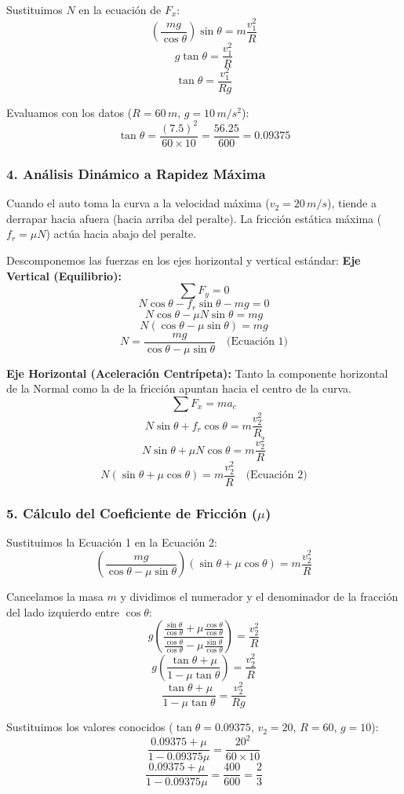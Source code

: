 \documentclass[12pt, a4paper]{article}
\begin{document}
Sustituimos $N$ en la ecuación de $F_x$:
$$ \left( \frac{mg}{\cos\theta} \right) \sin\theta = m \frac{v_1^2}{R} $$
$$ g \tan\theta = \frac{v_1^2}{R} $$
$$ \tan\theta = \frac{v_1^2}{Rg} $$

Evaluamos con los datos ($R = 60 \, \si{m}$, $g = 10 \, \si{m/s^2}$):
$$ \tan\theta = \frac{(7.5)^2}{60 \times 10} = \frac{56.25}{600} = 0.09375 $$

\subsubsection*{4. Análisis Dinámico a Rapidez Máxima}
Cuando el auto toma la curva a la velocidad máxima ($v_2 = 20 \, \si{m/s}$), tiende a derrapar hacia afuera (hacia arriba del peralte). La fricción estática máxima ($f_r = \mu N$) actúa hacia abajo del peralte.

Descomponemos las fuerzas en los ejes horizontal y vertical estándar:
\textbf{Eje Vertical (Equilibrio):}
$$ \sum F_y = 0 $$
$$ N \cos\theta - f_r \sin\theta - mg = 0 $$
$$ N \cos\theta - \mu N \sin\theta = mg $$
$$ N (\cos\theta - \mu \sin\theta) = mg $$
$$ N = \frac{mg}{\cos\theta - \mu \sin\theta} \quad \text{(Ecuación 1)} $$

\textbf{Eje Horizontal (Aceleración Centrípeta):}
Tanto la componente horizontal de la Normal como la de la fricción apuntan hacia el centro de la curva.
$$ \sum F_x = m a_c $$
$$ N \sin\theta + f_r \cos\theta = m \frac{v_2^2}{R} $$
$$ N \sin\theta + \mu N \cos\theta = m \frac{v_2^2}{R} $$
$$ N (\sin\theta + \mu \cos\theta) = m \frac{v_2^2}{R} \quad \text{(Ecuación 2)} $$

\subsubsection*{5. Cálculo del Coeficiente de Fricción ($\mu$)}
Sustituimos la Ecuación 1 en la Ecuación 2:
$$ \left( \frac{mg}{\cos\theta - \mu \sin\theta} \right) (\sin\theta + \mu \cos\theta) = m \frac{v_2^2}{R} $$

Cancelamos la masa $m$ y dividimos el numerador y el denominador de la fracción del lado izquierdo entre $\cos\theta$:
$$ g \left( \frac{\frac{\sin\theta}{\cos\theta} + \mu \frac{\cos\theta}{\cos\theta}}{\frac{\cos\theta}{\cos\theta} - \mu \frac{\sin\theta}{\cos\theta}} \right) = \frac{v_2^2}{R} $$
$$ g \left( \frac{\tan\theta + \mu}{1 - \mu \tan\theta} \right) = \frac{v_2^2}{R} $$
$$ \frac{\tan\theta + \mu}{1 - \mu \tan\theta} = \frac{v_2^2}{Rg} $$

Sustituimos los valores conocidos ($\tan\theta = 0.09375$, $v_2 = 20$, $R = 60$, $g = 10$):
$$ \frac{0.09375 + \mu}{1 - 0.09375 \mu} = \frac{20^2}{60 \times 10} $$
$$ \frac{0.09375 + \mu}{1 - 0.09375 \mu} = \frac{400}{600} = \frac{2}{3} $$
\end{document}
